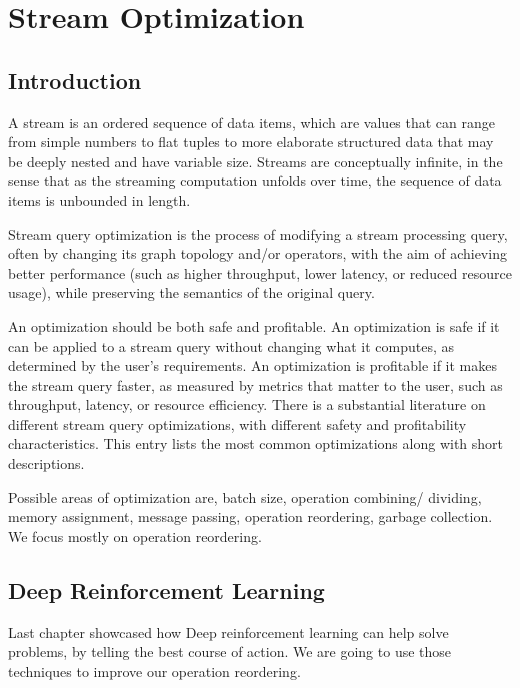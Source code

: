 \chapter{Stream Optimization}
\label{chapter:stream_optimization}
\thispagestyle{myheadings}

\graphicspath{}

\section{Introduction}
\cite{stream_query_optimization}A stream is an ordered sequence of data items, which are values that can range from simple numbers to flat tuples to more  elaborate structured data that may be deeply nested and have variable size. Streams are conceptually infinite, in the sense that  as the streaming computation unfolds over time, the sequence of data items is unbounded in length.
\par Stream query optimization is the process of modifying a stream processing query, often by changing its graph topology and/or  operators, with the aim of achieving better performance (such as higher throughput, lower latency, or reduced resource usage), while preserving the semantics of the original query.
\par An optimization should be both safe and profitable. An optimization is safe if it can be applied to a stream query without   changing what it computes, as determined by the user’s requirements. An optimization is profitable if it makes the stream query  faster, as measured by metrics that matter to the user, such as throughput, latency, or resource efficiency. There is a  substantial literature on different stream query optimizations, with different safety and profitability characteristics. This  entry lists the most common optimizations along with short descriptions.
\par Possible areas of optimization are, batch size, operation combining/ dividing, memory assignment, message passing, operation reordering, garbage collection. We focus mostly on operation reordering.

\section{Deep Reinforcement Learning}
Last chapter showcased how Deep reinforcement learning can help solve problems, by telling the best course of action. We are going to use those techniques to improve our operation reordering.

